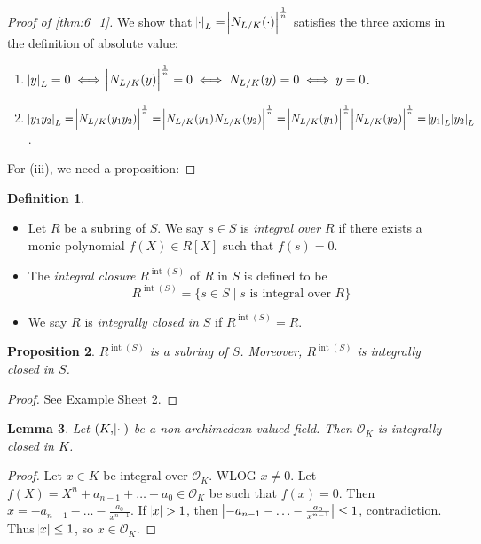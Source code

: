 \documentclass[11pt]{article}
\theoremstyle{definition}
\newtheorem{definition}{Definition}[subsection]
\theoremstyle{plain}
\newtheorem{proposition}[definition]{Proposition}
\newtheorem{lemma}[definition]{Lemma}
\theoremstyle{remark}
\renewcommand{\qedsymbol}{$\blacksquare$}
\DeclareMathOperator{\Int}{int}
\newcommand{\cO}{\mathcal{O}}
\begin{document}
\begin{proof}[Proof of \autoref{thm:6_1}]
    We show that $\abs{\cdot}_L = \abs{N_{L/K}(\cdot)}^\frac{1}{n}$ satisfies the three axioms in the definition of absolute value:
    \begin{enumerate}
        \item $\abs{y}_L = 0 \iff \abs{N_{L/K}(y)}^\frac{1}{n} = 0 \iff N_{L/K}(y) = 0 \iff y = 0$.
        \item $\abs{y_1 y_2}_L = \abs{N_{L/K}(y_1 y_2)}^\frac{1}{n} = \abs{N_{L/K}(y_1) N_{L/K}(y_2)}^\frac{1}{n} = \abs{N_{L/K}(y_1)}^\frac{1}{n} \abs{N_{L/K}(y_2)}^\frac{1}{n} = \abs{y_1}_L \abs{y_2}_L$.
    \end{enumerate}
    For (iii), we need a proposition:
    \renewcommand*{\qedsymbol}{}
\end{proof}

\begin{definition}\label{def:6_6}\phantom{}
    \begin{itemize}
        \item Let $R$ be a subring of $S$. We say $s \in S$ is \emph{integral over $R$} if there exists a monic polynomial $f(X) \in R[X]$ such that $f(s) = 0$.
        \item The \emph{integral closure} $R^{\Int(S)}$ of $R$ in $S$ is defined to be
            \begin{equation*}
                R^{\Int(S)} = \{s \in S \mid s \text{ is integral over } R\}
            \end{equation*}
        \item We say $R$ is \emph{integrally closed in $S$} if $R^{\Int(S)} = R$.
    \end{itemize}
\end{definition}

\begin{proposition}\label{prop:6_7}
    $R^{\Int(S)}$ is a subring of $S$. Moreover, $R^{\Int(S)}$ is integrally closed in $S$.
\end{proposition}
\begin{proof}
    See Example Sheet 2.
\end{proof}

\begin{lemma}\label{lem:6_8}
    Let $(K, \abs{\cdot})$ be a non-archimedean valued field. Then $\cO_K$ is integrally closed in $K$.
\end{lemma}
\begin{proof}
    Let $x \in K$ be integral over $\cO_K$. WLOG $x \neq 0$. Let $f(X) = X^n + a_{n-1} + \ldots + a_0 \in \cO_K$  be such that $f(x) = 0$. Then $x = -a_{n-1} - \ldots - \frac{a_0}{x^{n-1}}$. If $\abs{x} > 1$, then $\abs{-a_{n-1} - \ldots - \frac{a_0}{x^{n-1}}} \le 1$, contradiction. Thus $\abs{x} \le 1$, so $x \in \cO_K$.
\end{proof}
\end{document}
